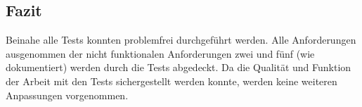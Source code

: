 \subsection{Fazit}
Beinahe alle Tests konnten problemfrei durchgeführt werden. Alle Anforderungen ausgenommen der nicht funktionalen Anforderungen zwei und fünf (wie dokumentiert)
werden durch die Tests abgedeckt. Da die Qualität und Funktion der Arbeit mit den Tests sichergestellt werden konnte, werden keine weiteren 
Anpassungen vorgenommen.
